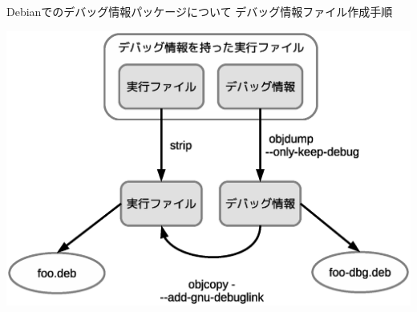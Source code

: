 \begin{frame}{Debianでのデバッグ情報パッケージについて}
デバッグ情報ファイル作成手順
\begin{center}
\includegraphics[width=1.0\hsize]{image2012-gum/ddebug-gum-image-data-debug-data04.eps}
\end{center}
\end{frame}

%
%


